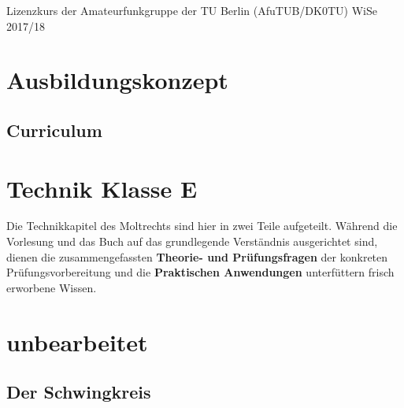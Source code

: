 \documentclass[ngerman, openany, twoside]{texdata/Script}
\begin{document}


%
  {Lizenzkurs der Amateurfunkgruppe der TU Berlin (AfuTUB/DK0TU)}%
  {WiSe 2017/18}%

\newpage

\newpage
\tableofcontents
\newpage



\part{Ausbildungskonzept}

\chapter{Curriculum}


\part{Technik Klasse E}

    Die Technikkapitel des Moltrechts sind hier in zwei Teile aufgeteilt.
    Während die Vorlesung und das Buch auf das grundlegende Verständnis
    ausgerichtet sind, dienen die zusammengefassten \textbf{Theorie- und
    Prüfungsfragen} der konkreten Prüfungsvorbereitung und die
    \textbf{Praktischen Anwendungen} unterfüttern frisch erworbene Wissen.

\clearpage




\part{unbearbeitet}



\chapter{Der Schwingkreis}

\end{document}
